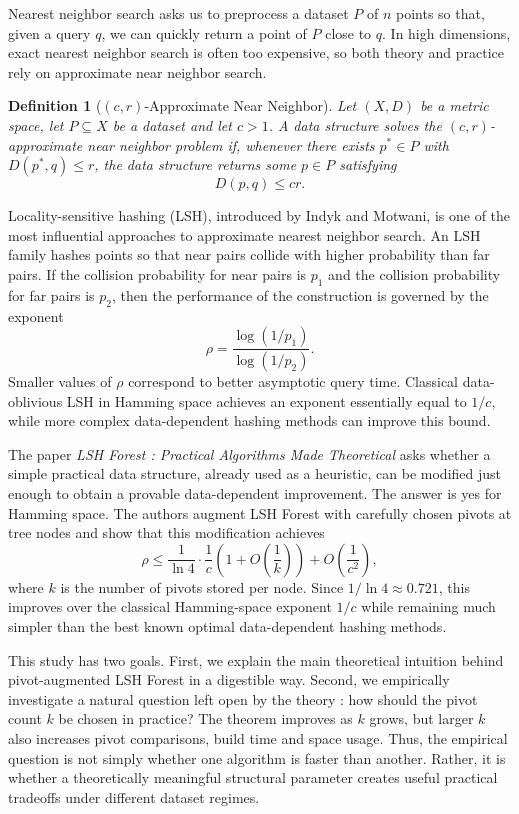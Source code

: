 \documentclass[11pt]{article}
\newtheorem{definition}{Definition}
\begin{document}
Nearest neighbor search asks us to preprocess a dataset $P$ of $n$ points so that, given a query $q$, we can quickly return a point of $P$ close to $q$. In high dimensions, exact nearest neighbor search is often too expensive, so both theory and practice rely on approximate near neighbor search.

\begin{definition}[$(c,r)$-Approximate Near Neighbor]
Let $(X,D)$ be a metric space, let $P \subseteq X$ be a dataset and let $c>1$. A data structure solves the $(c,r)$-approximate near neighbor problem if, whenever there exists $p^* \in P$ with $D(p^*,q) \le r$, the data structure returns some $p \in P$ satisfying
\[
    D(p,q) \le cr.
\]
\end{definition}

Locality-sensitive hashing (LSH), introduced by Indyk and Motwani, is one of the most influential approaches to approximate nearest neighbor search. An LSH family hashes points so that near pairs collide with higher probability than far pairs. If the collision probability for near pairs is $p_1$ and the collision probability for far pairs is $p_2$, then the performance of the construction is governed by the exponent
\[
    \rho = \frac{\log(1/p_1)}{\log(1/p_2)}.
\]
Smaller values of $\rho$ correspond to better asymptotic query time. Classical data-oblivious LSH in Hamming space achieves an exponent essentially equal to $1/c$, while more complex data-dependent hashing methods can improve this bound.

The paper \emph{LSH Forest : Practical Algorithms Made Theoretical} asks whether a simple practical data structure, already used as a heuristic, can be modified just enough to obtain a provable data-dependent improvement. The answer is yes for Hamming space. The authors augment LSH Forest with carefully chosen pivots at tree nodes and show that this modification achieves
\[
    \rho \le \frac{1}{\ln 4}\cdot \frac{1}{c}\left(1+O\left(\frac{1}{k}\right)\right) + O\left(\frac{1}{c^2}\right),
\]
where $k$ is the number of pivots stored per node. Since $1/\ln 4 \approx 0.721$, this improves over the classical Hamming-space exponent $1/c$ while remaining much simpler than the best known optimal data-dependent hashing methods.

This study has two goals. First, we explain the main theoretical intuition behind pivot-augmented LSH Forest in a digestible way. Second, we empirically investigate a natural question left open by the theory : how should the pivot count $k$ be chosen in practice? The theorem improves as $k$ grows, but larger $k$ also increases pivot comparisons, build time and space usage. Thus, the empirical question is not simply whether one algorithm is faster than another. Rather, it is whether a theoretically meaningful structural parameter creates useful practical tradeoffs under different dataset regimes.
\end{document}
